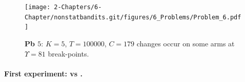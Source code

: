 \begin{figure}[h!]  %
    \centering
    \texttt{[image: 2-Chapters/6-Chapter/nonstatbandits.git/figures/6\_Problems/Problem\_6.pdf]}
    \caption{\textbf{Pb $5$}: $K=5$, $T=100000$, $C=179$ changes occur on some arms at $\Upsilon=81$ break-points.}
    \label{fig:6:Problem_6}
\end{figure}





\paragraph{First experiment: \UCB{} vs \klUCB{}.}
%


